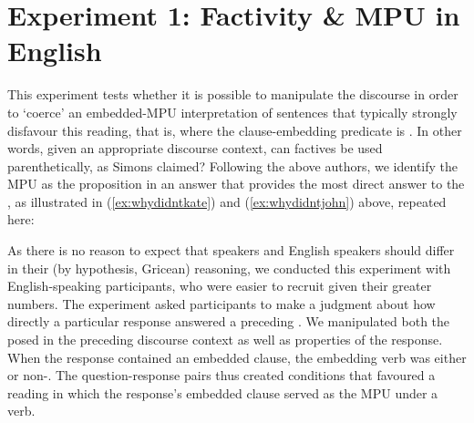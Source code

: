 \documentclass[output=paper]{langsci/langscibook}
\begin{document}
\section{Experiment 1:  Factivity \& MPU in English}

This experiment tests whether it is possible to manipulate the discourse in order to `coerce' an embedded-MPU interpretation of sentences that typically strongly disfavour this reading, that is, where the clause-embedding predicate is . In other words, given an appropriate discourse context, can factives be used parenthetically, as Simons claimed? Following the above authors, we identify the MPU as the proposition in an answer that provides the most direct answer to the , as illustrated in (\ref{ex:whydidntkate}) and (\ref{ex:whydidntjohn}) above, repeated here:


As there is no reason to expect that  speakers and English speakers should differ in their  (by hypothesis, Gricean) reasoning, we conducted this experiment with English-speaking participants, who were easier to recruit given their greater numbers. The experiment asked participants to make a judgment about how directly a particular response answered a preceding .  We manipulated both the  posed in the preceding discourse context as well as properties of the response.  When the response contained an embedded clause, the embedding verb was either  or non-. The question-response pairs thus created conditions that favoured a reading in which the response's embedded clause served as the MPU under a  verb.
\end{document}
